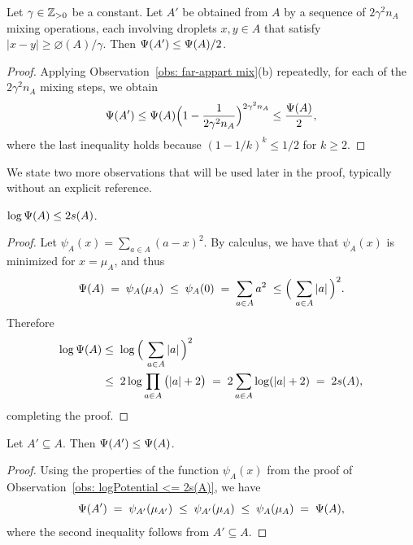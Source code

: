 
\begin{observation}\label{obs: far-appart constant mix}
	Let $\gamma\in{\mathbb{Z}_{> 0}}$ be a constant.   
	Let $A'$ be obtained from $A$ by a sequence of $2\gamma^2n_A$ mixing operations,
	each involving droplets $x,y\in A$ that satisfy $|x-y|\geq\diameter(A)/\gamma$.  
	Then ${\Psi}(A') \le {\Psi}(A)/2$.
\end{observation}

\begin{proof}
	Applying Observation~\ref{obs: far-appart mix}(b) repeatedly, for each of the
	$2\gamma^2n_A$ mixing steps, we obtain
	\begin{equation*}
		{\Psi}(A')
		\leq {\Psi}(A)\Big(1 - \frac{1}{2\gamma^2n_A}\Big)^{2\gamma^2n_A}
		\leq \frac{{\Psi}(A)}{2},
	\end{equation*}
	where the last inequality holds because $(1-1/k)^k \leq 1/2$ for $k\geq 2$.
\end{proof}



We state two more observations that will be used later in the proof, typically
without an explicit reference.

\begin{observation}\label{obs: logPotential <= 2s(A)}
	$\log{{\Psi}(A)}\leq 2s(A)$.
\end{observation}

\begin{proof}
	Let $\psi_A(x) =  \sum_{a\in A}(a-x)^2$. By calculus, we have that
	$\psi_A(x)$ is minimized for $x = \mu_A$, and thus
	\begin{equation*}
		 {\Psi}(A) \;=\; \psi_A(\mu_A)
						\;\le\; \psi_A(0)
						\; = \;  \sum_{a\in A}a^2
						\;\le    \Big(\,\sum_{a\in A} |a| \,\Big)^2.
	\end{equation*}   
	Therefore 
	\begin{align*}
		\log{\Psi}(A) &\leq\; \log\Big(\,\sum_{a\in A} |a| \,\Big)^2
		\\
		&\leq\; 2\log\prod_{a\in A}\big(|a|+2\big)
		\;=\; 2\sum_{a\in A}\log(|a|+2)
		\;=\; 2s(A),
	\end{align*}	
completing the proof.
\end{proof}

\begin{observation}\label{obs: psi(A') <= psi(A) for A' subseteq A}
	Let $A'\subseteq A$. Then ${\Psi}(A')\leq{\Psi}(A)$.
\end{observation}      

\begin{proof}  
Using the properties of the 
function $\psi_A(x)$ from the proof of Observation~\ref{obs: logPotential <= 2s(A)},
we have
%
\begin{equation*}	 
	 {\Psi}(A') \;=\; \psi_{A'}(\mu_{A'})
	 				\;\leq\; \psi_{A'}(\mu_{A})   
	 				\;\leq\; \psi_{A}(\mu_{A})  
	   				\;=\; {\Psi}(A),
\end{equation*}	
%
where the second inequality follows from $A'\subseteq A$.  	
\end{proof}





